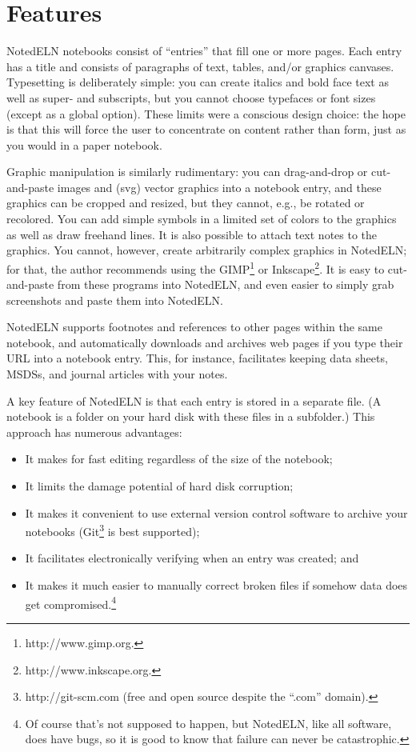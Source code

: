 \documentclass[11pt]{report}
\begin{document}
\section{Features}

NotedELN notebooks consist of ``entries'' that fill one or more pages.
Each entry has a title and consists of paragraphs of text, tables, and/or
graphics canvases. Typesetting is deliberately simple: you can create italics
and bold face text as well as super- and subscripts, but you cannot
choose typefaces or font sizes (except as a global option). These
limits were a conscious design choice: the hope is that this will
force the user to concentrate on content rather than form, just as you
would in a paper notebook.

Graphic manipulation is similarly rudimentary: you can drag-and-drop
or cut-and-paste images and (svg) vector graphics into a notebook
entry, and these graphics can be cropped and resized, but they cannot,
e.g., be rotated or recolored. You can add simple symbols in a limited
set of colors to the graphics as well as draw freehand lines. It is also
possible to attach text notes to the graphics. You cannot, however,
create arbitrarily complex graphics in NotedELN; for that, the author
recommends using the GIMP\footnote{http://www.gimp.org.} or
Inkscape\footnote{http://www.inkscape.org.}. It is easy to
cut-and-paste from these programs into NotedELN, and even easier to simply
grab screenshots and paste them into NotedELN.

NotedELN supports footnotes and references to other pages within the same
notebook, and automatically downloads and archives web pages if you
type their URL into a notebook entry. This, for instance, facilitates
keeping data sheets, MSDSs, and journal articles with your notes.

A key feature of NotedELN is that each entry is stored in a separate
file. (A notebook is a folder on your hard disk with these files in a
subfolder.) This approach has numerous advantages:
\begin{itemize}
  \item It makes for fast
editing regardless of the size of the notebook;
\item It limits the damage
potential of hard disk corruption;
\item It makes it convenient to use external version control software
  to archive your notebooks (Git\footnote{http://git-scm.com (free and
    open source despite the ``.com'' domain).} is best
  supported);
\item It facilitates electronically verifying when an
entry was created; and
\item It makes it much easier to manually correct
broken files if somehow data does get compromised.\footnote{Of course
  that's not supposed to happen, but NotedELN, like all software, does have
  bugs, so it is good to know that failure can never be catastrophic.}
\end{itemize}
\end{document}
